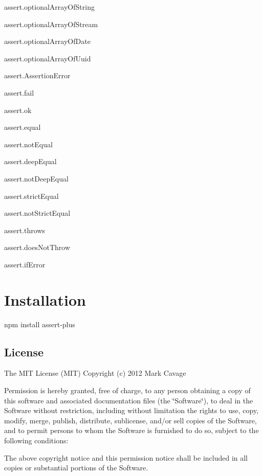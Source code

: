 \begin{DoxyItemize}
\item assert.\+optional\+Array\+Of\+String
\item assert.\+optional\+Array\+Of\+Stream
\item assert.\+optional\+Array\+Of\+Date
\item assert.\+optional\+Array\+Of\+Uuid
\item assert.\+Assertion\+Error
\item assert.\+fail
\item assert.\+ok
\item assert.\+equal
\item assert.\+not\+Equal
\item assert.\+deep\+Equal
\item assert.\+not\+Deep\+Equal
\item assert.\+strict\+Equal
\item assert.\+not\+Strict\+Equal
\item assert.\+throws
\item assert.\+does\+Not\+Throw
\item assert.\+if\+Error
\end{DoxyItemize}

\section*{Installation}

\begin{DoxyVerb}npm install assert-plus
\end{DoxyVerb}


\subsection*{License}

The M\+IT License (M\+IT) Copyright (c) 2012 Mark Cavage

Permission is hereby granted, free of charge, to any person obtaining a copy of this software and associated documentation files (the \char`\"{}\+Software\char`\"{}), to deal in the Software without restriction, including without limitation the rights to use, copy, modify, merge, publish, distribute, sublicense, and/or sell copies of the Software, and to permit persons to whom the Software is furnished to do so, subject to the following conditions\+:

The above copyright notice and this permission notice shall be included in all copies or substantial portions of the Software.


